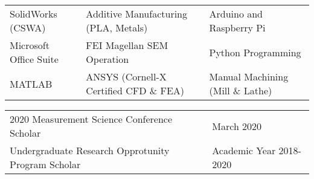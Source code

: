 \documentclass[10pt]{article}
\begin{document}
\myrule

\noindent\begin{tabular}{lll}
SolidWorks (CSWA)      & Additive Manufacturing (PLA, Metals) & Arduino and Raspberry Pi         \\
Microsoft Office Suite & FEI Magellan SEM Operation                    & Python Programming               \\
MATLAB                 & ANSYS (Cornell-X Certified CFD \& FEA)        & Manual Machining (Mill \& Lathe)
\end{tabular}

\vspace{0.15in}

\myrule

\noindent\begin{tabular}{ll}
    2020 Measurement Science Conference Scholar        & \hspace{54mm} March 2020              \\
    Undergraduate Research Opprotunity Program Scholar & \hspace{32.5mm} Academic Year 2018-2020
\end{tabular}
\end{document}
